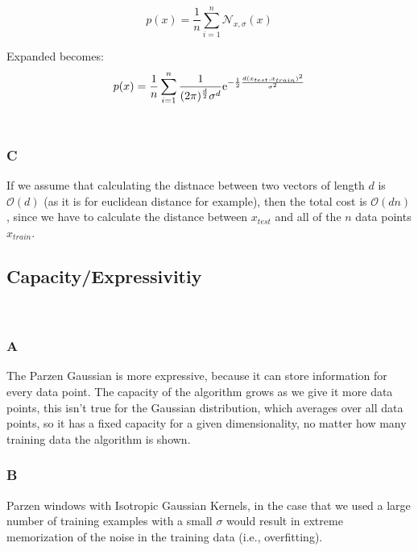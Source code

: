 \documentclass{amsart}
\theoremstyle{definition}
\theoremstyle{remark}
\numberwithin{equation}{section}
\begin{document}
\begin{equation}
    p(x) = \frac{1}{n}\sum_{i=1}^{n}\mathcal{N}_{x, \sigma}(x)
\end{equation}

Expanded becomes: \\

\begin{equation}
    p(x) = \frac{1}{n}\sum_{i=1}^{n} \frac{1}{(2\pi)^{\frac{d}{2}} \sigma^d} {\rm e}^{-\frac{1}{2}\frac{d(x_{test}, x_{train})^2}{\sigma^2} }
\end{equation}\\

\subsubsection{C} 

If we assume that calculating the distnace between two vectors of length $d$ is 
$\mathcal{O}(d)$ (as it is for euclidean distance for example), then the total
cost is  $\mathcal{O}(dn)$, since we have to calculate the distance between 
$x_{test}$ and all of the $n$ data points $x_{train}$. \\

\subsection{Capacity/Expressivitiy} \\
\subsubsection{A} 

The Parzen Gaussian is more expressive, because it can store information for
every data point. The capacity of the algorithm grows as we give it more data 
points, this isn't true for the Gaussian distribution, which averages over all 
data points, so it has a fixed capacity for a given dimensionality, no matter 
how many training data the algorithm is shown. \\

\subsubsection{B} 

Parzen windows with Isotropic Gaussian Kernels, in the case that we used a 
large number of training examples with a small $\sigma$ would result in extreme 
memorization of the noise in the training data (i.e., overfitting). \\
\end{document}
